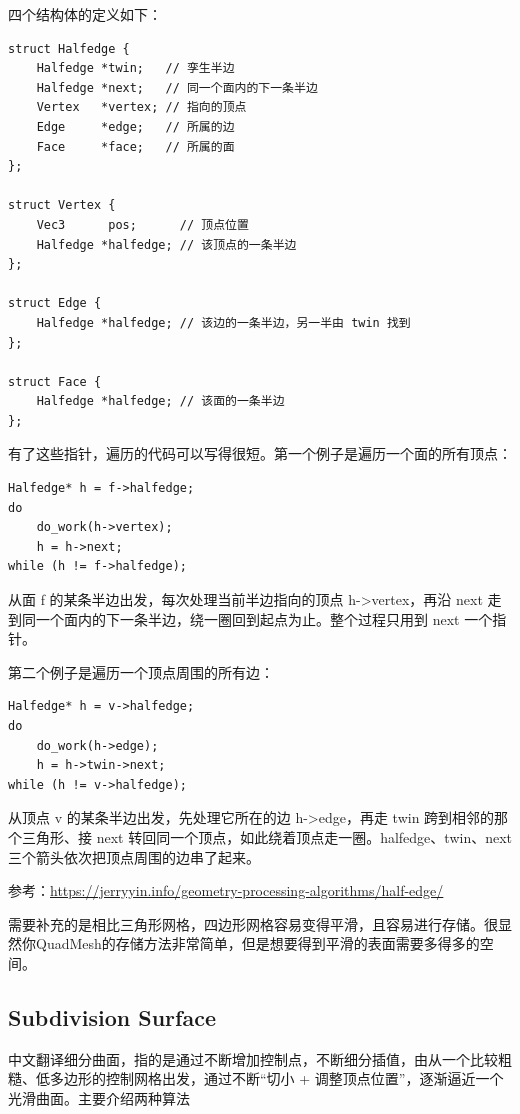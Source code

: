 四个结构体的定义如下：

\begin{lstlisting}[style=MyCppStyle]
struct Halfedge {
    Halfedge *twin;   // 孪生半边
    Halfedge *next;   // 同一个面内的下一条半边
    Vertex   *vertex; // 指向的顶点
    Edge     *edge;   // 所属的边
    Face     *face;   // 所属的面
};

struct Vertex {
    Vec3      pos;      // 顶点位置
    Halfedge *halfedge; // 该顶点的一条半边
};

struct Edge {
    Halfedge *halfedge; // 该边的一条半边，另一半由 twin 找到
};

struct Face {
    Halfedge *halfedge; // 该面的一条半边
};
\end{lstlisting}

有了这些指针，遍历的代码可以写得很短。第一个例子是遍历一个面的所有顶点：

\begin{lstlisting}[style=MyCppStyle]
Halfedge* h = f->halfedge;
do
    do_work(h->vertex);
    h = h->next;
while (h != f->halfedge);
\end{lstlisting}

从面 f 的某条半边出发，每次处理当前半边指向的顶点 h->vertex，再沿 next 走到同一个面内的下一条半边，绕一圈回到起点为止。整个过程只用到 next 一个指针。

第二个例子是遍历一个顶点周围的所有边：

\begin{lstlisting}[style=MyCppStyle]
Halfedge* h = v->halfedge;
do
    do_work(h->edge);
    h = h->twin->next;
while (h != v->halfedge);
\end{lstlisting}

从顶点 v 的某条半边出发，先处理它所在的边 h->edge，再走 twin 跨到相邻的那个三角形、接 next 转回同一个顶点，如此绕着顶点走一圈。halfedge、twin、next 三个箭头依次把顶点周围的边串了起来。

参考：\url{https://jerryyin.info/geometry-processing-algorithms/half-edge/}

需要补充的是相比三角形网格，四边形网格容易变得平滑，且容易进行存储。很显然你QuadMesh的存储方法非常简单，但是想要得到平滑的表面需要多得多的空间。

\subsection{Subdivision Surface}

中文翻译细分曲面，指的是通过不断增加控制点，不断细分插值，由从一个比较粗糙、低多边形的控制网格出发，通过不断“切小 + 调整顶点位置”，逐渐逼近一个光滑曲面。主要介绍两种算法

